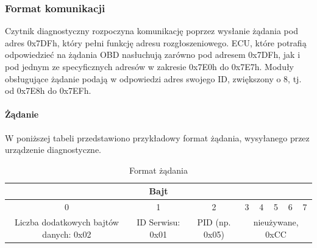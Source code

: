 \documentclass[10pt,a4paper]{article}
\begin{document}
		\subsubsection{Format komunikacji}
		Czytnik diagnostyczny rozpoczyna komunikację poprzez wysłanie żądania pod adres 0x7DFh, który pełni funkcję adresu rozgłoszeniowego. ECU, które potrafią odpowiedzieć na żądania OBD nasłuchują zarówno pod adresem 0x7DFh, jak i pod jednym ze specyficznych adresów w zakresie 0x7E0h do 0x7E7h. Moduły obsługujące żądanie podają w odpowiedzi adres swojego ID, zwiększony o 8, tj. od 0x7E8h do 0x7EFh.
		\paragraph{Żądanie}
		W poniższej tabeli przedstawiono przykładowy format żądania, wysyłanego przez urządzenie diagnostyczne.
		\begin{table}[H]
			\caption{Format żądania}
			\begin{center}
				\begin{tabular}{|c|c|c|c|c|c|c|c|}
					\hline
					\multicolumn{8}{|c|}{Bajt}\\
					\hline
					0&1&2&3&4&5&6&7\\
					\hline
					Liczba dodatkowych bajtów danych: 0x02& ID Serwisu: 0x01&PID (np. 0x05)&\multicolumn{5}{|c|}{nieużywane, 0xCC}\\
					\hline
				\end{tabular}
			\end{center}
			\label{tab:żądanie}
		\end{table}
\end{document}
